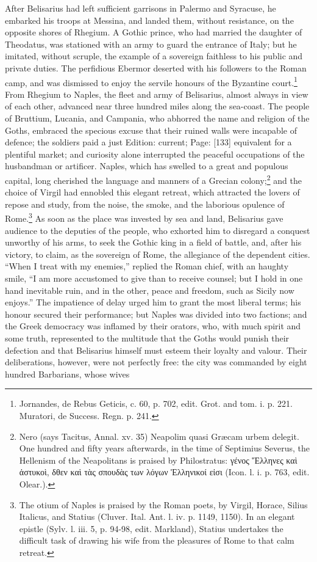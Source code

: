 After Belisarius had left sufficient garrisons in Palermo and Syracuse, he embarked his troops at Messina, and landed them, without resistance, on the opposite shores of Rhegium. A Gothic prince, who had married the daughter of Theodatus, was stationed with an army to guard the entrance of Italy; but he imitated, without scruple, the example of a sovereign faithless to his public and private duties. The perfidious Ebermor deserted with his followers to the Roman camp, and was dismissed to enjoy the servile honours of the Byzantine court.\footnote{Jornandes, de Rebus Geticis, c. 60, p. 702, edit. Grot. and tom. i. p. 221. Muratori, de Success. Regn. p. 241.} From Rhegium to Naples, the fleet and army of Belisarius, almost always in view of each other, advanced near three hundred miles along the sea-coast. The people of Bruttium, Lucania, and Campania, who abhorred the name and religion of the Goths, embraced the specious excuse that their ruined walls were incapable of defence; the soldiers paid a just Edition: current; Page: [133] equivalent for a plentiful market; and curiosity alone interrupted the peaceful occupations of the husbandman or artificer. Naples, which has swelled to a great and populous capital, long cherished the language and manners of a Grecian colony;\footnote{Nero (says Tacitus, Annal. xv. 35) Neapolim quasi Græcam urbem delegit. One hundred and fifty years afterwards, in the time of Septimius Severus, the Hellenism of the Neapolitans is praised by Philostratus: \textgreek{γένος \texthebrew{Ἕ}λληνες κα\texthebrew{ὶ ἀ}στυκο\texthebrew{ὶ}, δθεν κα\texthebrew{ὶ} τ\texthebrew{ὰ}ς σπουδ\texthebrew{ὰ}ς των λόγων \texthebrew{Ἑ}λληνικοί ε\texthebrew{ἰ}σι} (Icon. l. i. p. 763, edit. Olear.).} and the choice of Virgil had ennobled this elegant retreat, which attracted the lovers of repose and study, from the noise, the smoke, and the laborious opulence of Rome.\footnote{The otium of Naples is praised by the Roman poets, by Virgil, Horace, Silius Italicus, and Statius (Cluver. Ital. Ant. l. iv. p. 1149, 1150). In an elegant epistle (Sylv. l. iii. 5, p. 94-98, edit. Markland), Statius undertakes the difficult task of drawing his wife from the pleasures of Rome to that calm retreat.} As soon as the place was invested by sea and land, Belisarius gave audience to the deputies of the people, who exhorted him to disregard a conquest unworthy of his arms, to seek the Gothic king in a field of battle, and, after his victory, to claim, as the sovereign of Rome, the allegiance of the dependent cities. \texthebrew{“}When I treat with my enemies,\texthebrew{}” replied the Roman chief, with an haughty smile, \texthebrew{“}I am more accustomed to give than to receive counsel; but I hold in one hand inevitable ruin, and in the other, peace and freedom, such as Sicily now enjoys.\texthebrew{}” The impatience of delay urged him to grant the most liberal terms; his honour secured their performance; but Naples was divided into two factions; and the Greek democracy was inflamed by their orators, who, with much spirit and some truth, represented to the multitude that the Goths would punish their defection and that Belisarius himself must esteem their loyalty and valour. Their deliberations, however, were not perfectly free: the city was commanded by eight hundred Barbarians, whose wives 